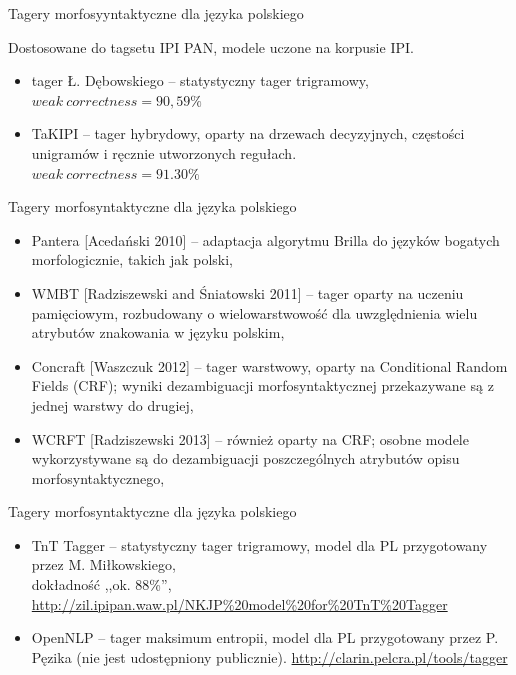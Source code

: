 \documentclass[xcolor=dvipsnames,polish]{beamer}
\begin{document}
\begin{frame}{Tagery morfosyyntaktyczne dla języka polskiego}
\vspace{0.5cm}

Dostosowane do tagsetu IPI PAN, modele uczone na korpusie IPI.
\begin{itemize}
\item tager Ł. Dębowskiego -- statystyczny tager trigramowy,\\
$weak\ correctness = 90,59\%$
\item TaKIPI -- tager hybrydowy, oparty na drzewach decyzyjnych, częstości unigramów i ręcznie utworzonych regułach.\\
$weak\ correctness = 91.30\%$
\end{itemize}
\end{frame}

\begin{frame}{Tagery morfosyntaktyczne dla języka polskiego}
\begin{itemize}
\item Pantera [Acedański 2010] -- adaptacja algorytmu Brilla do języków bogatych morfologicznie, takich jak polski,
\item WMBT [Radziszewski and Śniatowski 2011] -- tager oparty na uczeniu pamięciowym, rozbudowany o wielowarstwowość dla uwzględnienia wielu atrybutów znakowania w języku polskim,
\item Concraft [Waszczuk 2012] -- tager warstwowy, oparty na Conditional Random Fields (CRF); wyniki dezambiguacji morfosyntaktycznej przekazywane są z jednej warstwy do drugiej,
\item WCRFT [Radziszewski 2013] -- również oparty na CRF; osobne modele wykorzystywane są do dezambiguacji poszczególnych atrybutów opisu morfosyntaktycznego,
\end{itemize}
\end{frame}

\begin{frame}{Tagery morfosyntaktyczne dla języka polskiego}
\begin{itemize}
\item TnT Tagger -- statystyczny tager trigramowy, model dla PL przygotowany przez M. Miłkowskiego,\\
dokładność ,,ok. 88\%'',\\
{\footnotesize \url{http://zil.ipipan.waw.pl/NKJP\%20model\%20for\%20TnT\%20Tagger}}
\item OpenNLP -- tager maksimum entropii, model dla PL przygotowany przez P. Pęzika (nie jest udostępniony publicznie).
{\footnotesize \url{http://clarin.pelcra.pl/tools/tagger}}
\end{itemize}
\end{frame}
\end{document}
